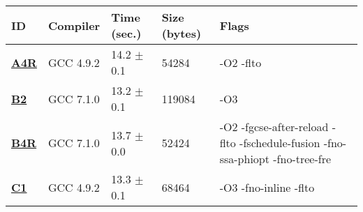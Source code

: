     \begin{tabular}{|l|l|l|l|p{3.2in}|}
     \hline
      \textbf{ID} & \textbf{Compiler} & \textbf{Time (sec.)} & \textbf{Size (bytes)} & \textbf{Flags} \\ 
     \hline
      \textbf{ \href{http://cknowledge.org/repo/web.php?wcid=experiment:85a9d07941d187e4\&subpoint=c59cc63440c795a7}{A4R} } &  GCC 4.9.2  &  14.2 $\pm$ 0.1  &  54284  & {\small -O2 -flto }\\
     \hline
      \textbf{ \href{http://cknowledge.org/repo/web.php?wcid=experiment:50948cede943469a\&subpoint=381aef856bc24d3d}{B2} } &  GCC 7.1.0  &  13.2 $\pm$ 0.1  &  119084  & {\small -O3 }\\
     \hline
      \textbf{ \href{http://cknowledge.org/repo/web.php?wcid=experiment:3a9a0b4e4740a607\&subpoint=a8e09e075b5b4a38}{B4R} } &  GCC 7.1.0  &  13.7 $\pm$ 0.0  &  52424  & {\small -O2 -fgcse-after-reload -flto -fschedule-fusion -fno-ssa-phiopt -fno-tree-fre }\\
     \hline
      \textbf{ \href{http://cknowledge.org/repo/web.php?wcid=experiment:047ddbe5ef0ab588\&subpoint=0b17daf9418aaa6d}{C1} } &  GCC 4.9.2  &  13.3 $\pm$ 0.1  &  68464  & {\small -O3 -fno-inline -flto }\\
     \hline
    \end{tabular}    